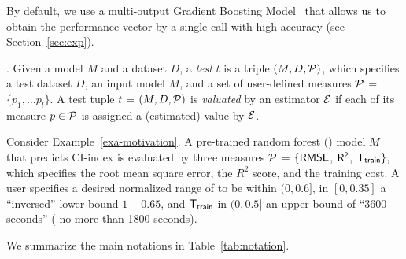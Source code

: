 By default, we use 
a multi-output Gradient Boosting Model~\cite{scikit-learn} 
that allows us to obtain  
the performance vector 
by a single call with 
high accuracy (see Section~\ref{sec:exp}). 

. 
Given a model $M$ and a  
dataset $D$, a {\em test} $t$ 
is a triple $(M,D,\P)$, which  
specifies a test dataset $D$, 
an input model $M$, and 
 a set of user-defined measures 
$\P$ = $\{p_1, \ldots p_l\}$. 
 A test tuple $t$ = $(M,D,\P)$ 
 is {\em valuated} by 
 an estimator $\E$ if 
 each of its measure $p\in \P$ is 
 assigned a (estimated) value by $\E$. 








\begin{example}
\label{exa-models}
Consider
Example~\ref{exa-motivation}. A pre-trained 
random forest () model 
$M$ that predicts CI-index is evaluated by three measures 
$\P$ = $\{\kw{RMSE}$, $\kw{R^2}$, $\kw{T_{train}}\}$, which specifies 
the root mean square error, the $R^2$ score, 
and the training cost. A user specifies 
a desired normalized range of 
 to be within 
$(0,0.6]$,  in $[0, 0.35]$ \wrt a ``inversed'' lower bound $1-0.65$,
and $\kw{T_{train}}$ 
in $(0,0.5]$  \wrt an upper bound of 
``3600 seconds'' (\ie 
no more than 1800 seconds).
\end{example}

We summarize the main notations 
in Table~\ref{tab:notation}. 




